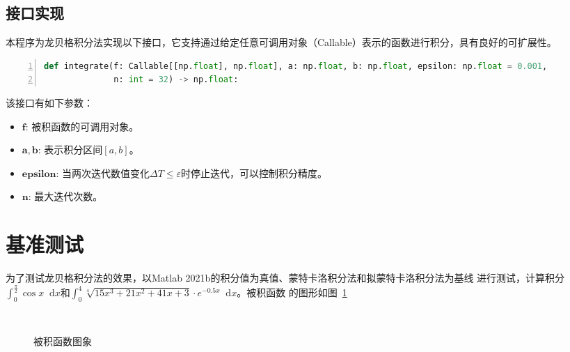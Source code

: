 \documentclass[a4paper,twoside]{article}
\newcommand*{\dif}{\mathop{}\!\mathrm{d}}
\begin{document}
\begin{spacing}{1.2}
\subsection{接口实现}

本程序为龙贝格积分法实现以下接口，它支持通过给定任意可调用对象（Callable）表示的函数进行积分，具有良好的可扩展性。
\begin{lstlisting}[language=Python,numbers=left,style=PythonStyle,label={code:interface}]
def integrate(f: Callable[[np.float], np.float], a: np.float, b: np.float, epsilon: np.float = 0.001,
              n: int = 32) -> np.float:
\end{lstlisting}

该接口有如下参数：
\begin{itemize}
	\item $\mathbf{f}$: 被积函数的可调用对象。
	\item $\mathbf{a}, \mathbf{b}$: 表示积分区间$[a,b]$。
	\item $\mathbf{epsilon}$: 当两次迭代数值变化$\Delta T\le \varepsilon$时停止迭代，可以控制积分精度。
	\item  $\mathbf{n}$: 最大迭代次数。
\end{itemize}


\section{基准测试}

为了测试龙贝格积分法的效果，以Matlab 2021b的积分值为真值、蒙特卡洛积分法和拟蒙特卡洛积分法为基线
进行测试，计算积分$\int_0^{\frac{\pi}{2}}\cos x \dif x$和$\int_0^4\sqrt[4]{15x^3+21x^2+41x+3}\cdot e^{-0.5x}\dif x$。被积函数
的图形如图~\ref{fig:funcs}

\begin{figure}[H]
	\centering 
	~
	\caption{被积函数图象} 
	\label{fig:funcs}
\end{figure}


\end{spacing}
\end{document}
